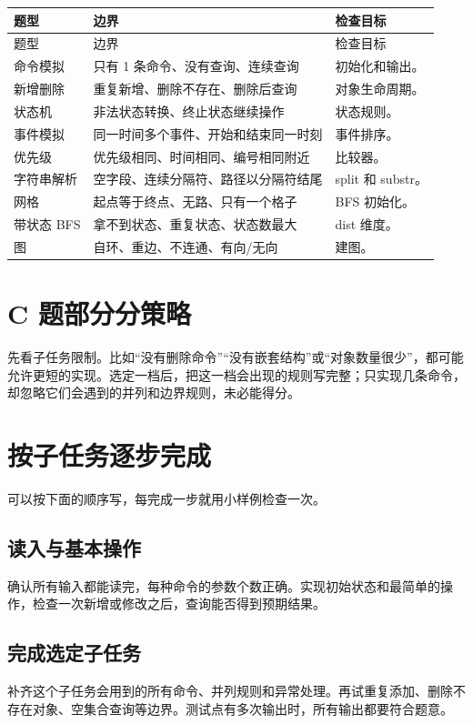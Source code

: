 \begin{longtable}{p{4cm}p{5cm}p{5cm}}
\toprule
题型 & 边界 & 检查目标 \\
\midrule
\endfirsthead
\toprule
题型 & 边界 & 检查目标 \\
\midrule
\endhead
命令模拟 & 只有 1 条命令、没有查询、连续查询 & 初始化和输出。 \\
新增删除 & 重复新增、删除不存在、删除后查询 & 对象生命周期。 \\
状态机 & 非法状态转换、终止状态继续操作 & 状态规则。 \\
事件模拟 & 同一时间多个事件、开始和结束同一时刻 & 事件排序。 \\
优先级 & 优先级相同、时间相同、编号相同附近 & 比较器。 \\
字符串解析 & 空字段、连续分隔符、路径以分隔符结尾 & split 和 substr。 \\
网格 & 起点等于终点、无路、只有一个格子 & BFS 初始化。 \\
带状态 BFS & 拿不到状态、重复状态、状态数最大 & dist 维度。 \\
图 & 自环、重边、不连通、有向/无向 & 建图。 \\
\bottomrule
\end{longtable}

\section{C 题部分分策略}\label{sec:07-36}
先看子任务限制。比如“没有删除命令”“没有嵌套结构”或“对象数量很少”，都可能允许更短的实现。选定一档后，把这一档会出现的规则写完整；只实现几条命令，却忽略它们会遇到的并列和边界规则，未必能得分。

\section{按子任务逐步完成}\label{sec:07-37}
可以按下面的顺序写，每完成一步就用小样例检查一次。

\subsection{读入与基本操作}
确认所有输入都能读完，每种命令的参数个数正确。实现初始状态和最简单的操作，检查一次新增或修改之后，查询能否得到预期结果。

\subsection{完成选定子任务}
补齐这个子任务会用到的所有命令、并列规则和异常处理。再试重复添加、删除不存在对象、空集合查询等边界。测试点有多次输出时，所有输出都要符合题意。

